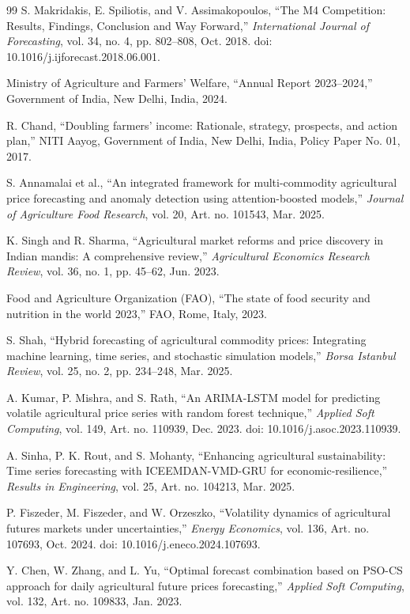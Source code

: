 \documentclass[12pt,a4paper]{report}
\theoremstyle{definition}
\theoremstyle{remark}
\begin{document}
\begin{thebibliography}{99}
S. Makridakis, E. Spiliotis, and V. Assimakopoulos,
``The M4 Competition: Results, Findings, Conclusion and Way Forward,''
{\em International Journal of Forecasting}, vol. 34, no. 4, pp. 802--808, Oct. 2018. doi: 10.1016/j.ijforecast.2018.06.001.

Ministry of Agriculture and Farmers' Welfare,
``Annual Report 2023--2024,''
Government of India, New Delhi, India, 2024.

R. Chand,
``Doubling farmers' income: Rationale, strategy, prospects, and action plan,''
NITI Aayog, Government of India, New Delhi, India, Policy Paper No. 01, 2017.

S. Annamalai et al.,
``An integrated framework for multi-commodity agricultural price forecasting and anomaly detection using attention-boosted models,''
{\em Journal of Agriculture Food Research}, vol. 20, Art. no. 101543, Mar. 2025.

K. Singh and R. Sharma,
``Agricultural market reforms and price discovery in Indian mandis: A comprehensive review,''
{\em Agricultural Economics Research Review}, vol. 36, no. 1, pp. 45--62, Jun. 2023.

Food and Agriculture Organization (FAO),
``The state of food security and nutrition in the world 2023,''
FAO, Rome, Italy, 2023.

S. Shah,
``Hybrid forecasting of agricultural commodity prices: Integrating machine learning, time series, and stochastic simulation models,''
{\em Borsa Istanbul Review}, vol. 25, no. 2, pp. 234--248, Mar. 2025.

A. Kumar, P. Mishra, and S. Rath,
``An ARIMA-LSTM model for predicting volatile agricultural price series with random forest technique,''
{\em Applied Soft Computing}, vol. 149, Art. no. 110939, Dec. 2023. doi: 10.1016/j.asoc.2023.110939.

A. Sinha, P. K. Rout, and S. Mohanty,
``Enhancing agricultural sustainability: Time series forecasting with ICEEMDAN-VMD-GRU for economic-resilience,''
{\em Results in Engineering}, vol. 25, Art. no. 104213, Mar. 2025.

P. Fiszeder, M. Fiszeder, and W. Orzeszko,
``Volatility dynamics of agricultural futures markets under uncertainties,''
{\em Energy Economics}, vol. 136, Art. no. 107693, Oct. 2024. doi: 10.1016/j.eneco.2024.107693.

Y. Chen, W. Zhang, and L. Yu,
``Optimal forecast combination based on PSO-CS approach for daily agricultural future prices forecasting,''
{\em Applied Soft Computing}, vol. 132, Art. no. 109833, Jan. 2023.


\end{thebibliography}
\end{document}
